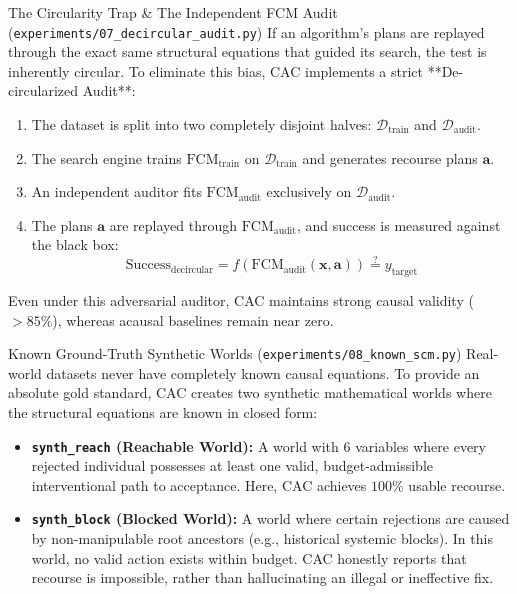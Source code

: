 \documentclass[11pt,a4paper]{article}
\begin{document}
\begin{parentconcept}{The Circularity Trap \& The Independent FCM Audit (\texttt{experiments/07\_decircular\_audit.py})}
If an algorithm's plans are replayed through the exact same structural equations that guided its search, the test is inherently circular. To eliminate this bias, CAC implements a strict **De-circularized Audit**:
\begin{enumerate}[leftmargin=1.5em]
    \item The dataset is split into two completely disjoint halves: $\mathcal{D}_{\text{train}}$ and $\mathcal{D}_{\text{audit}}$.
    \item The search engine trains $\mathrm{FCM}_{\text{train}}$ on $\mathcal{D}_{\text{train}}$ and generates recourse plans $\mathbf{a}$.
    \item An independent auditor fits $\mathrm{FCM}_{\text{audit}}$ exclusively on $\mathcal{D}_{\text{audit}}$.
    \item The plans $\mathbf{a}$ are replayed through $\mathrm{FCM}_{\text{audit}}$, and success is measured against the black box:
    \begin{equation}
    \mathrm{Success}_{\text{decircular}} = f\left(\mathrm{FCM}_{\text{audit}}\left(\mathbf{x}, \mathbf{a}\right)\right) \stackrel{?}{=} y_{\text{target}}
    \end{equation}
\end{enumerate}
Even under this adversarial auditor, CAC maintains strong causal validity ($> 85\%$), whereas acausal baselines remain near zero.
\end{parentconcept}

\begin{parentconcept}{Known Ground-Truth Synthetic Worlds (\texttt{experiments/08\_known\_scm.py})}
Real-world datasets never have completely known causal equations. To provide an absolute gold standard, CAC creates two synthetic mathematical worlds where the structural equations are known in closed form:
\begin{itemize}[leftmargin=1.5em]
    \item \textbf{\texttt{synth\_reach} (Reachable World):} A world with 6 variables where every rejected individual possesses at least one valid, budget-admissible interventional path to acceptance. Here, CAC achieves $100\%$ usable recourse.
    \item \textbf{\texttt{synth\_block} (Blocked World):} A world where certain rejections are caused by non-manipulable root ancestors (e.g., historical systemic blocks). In this world, no valid action exists within budget. CAC honestly reports that recourse is impossible, rather than hallucinating an illegal or ineffective fix.
\end{itemize}
\end{parentconcept}
\end{document}
